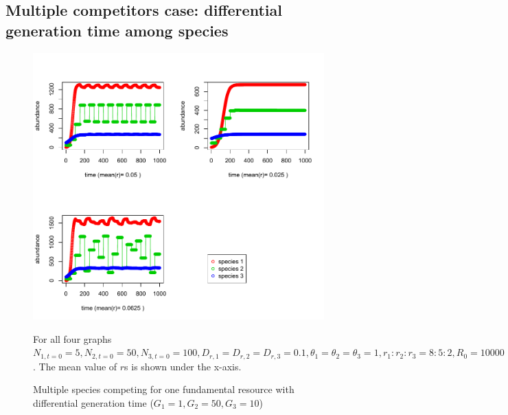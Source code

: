 \documentclass[12pt]{article}
\begin{document}
\subsection{Multiple competitors case: differential generation time among species}
\begin{figure}
 \includegraphics[width=\textwidth]{oscillation_r_effect.pdf}
 \caption{Multiple species competing for one fundamental resource with differential generation time ($G_1=1, G_2=50, G_3=10$)}
For all four graphs $ N_{1,t=0}=5, N_{2,t=0}=50,N_{3,t=0}=100, D_{r,1}=D_{r,2}=D_{r,3}=0.1, \theta_1=\theta_2=\theta_3=1, r_1: r_2:r_3= 8:5:2, R_0=10000$. The mean value of $r$s is shown under the x-axis.
\end{figure}
\end{document}
